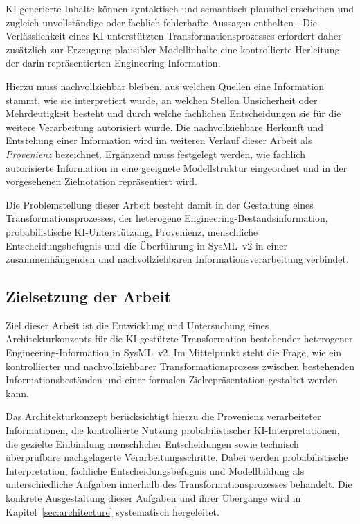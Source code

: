 KI-generierte Inhalte können syntaktisch und semantisch plausibel erscheinen
und zugleich unvollständige oder fachlich fehlerhafte Aussagen enthalten
\cite{Topcu2025,Barke2023,Sergeyuk2025}. Die Verlässlichkeit eines
KI-unterstützten Transformationsprozesses erfordert daher zusätzlich zur
Erzeugung plausibler Modellinhalte eine kontrollierte Herleitung der darin
repräsentierten Engineering-Information.

Hierzu muss nachvollziehbar bleiben, aus welchen Quellen eine Information
stammt, wie sie interpretiert wurde, an welchen Stellen Unsicherheit oder
Mehrdeutigkeit besteht und durch welche fachlichen Entscheidungen sie für
die weitere Verarbeitung autorisiert wurde. Die nachvollziehbare Herkunft
und Entstehung einer Information wird im weiteren Verlauf dieser Arbeit als
\emph{Provenienz} bezeichnet. Ergänzend muss festgelegt werden, wie fachlich
autorisierte Information in eine geeignete Modellstruktur eingeordnet und in
der vorgesehenen Zielnotation repräsentiert wird.

Die Problemstellung dieser Arbeit besteht damit in der Gestaltung eines
Transformationsprozesses, der heterogene Engineering-Bestandsinformation,
probabilistische KI-Unterstützung, Provenienz, menschliche
Entscheidungsbefugnis und die Überführung in SysML~v2 in einer
zusammenhängenden und nachvollziehbaren Informationsverarbeitung verbindet.


\subsection{Zielsetzung der Arbeit}
\label{sec:zielsetzung}

Ziel dieser Arbeit ist die Entwicklung und Untersuchung eines
Architekturkonzepts für die KI-gestützte Transformation bestehender
heterogener Engineering-Information in SysML~v2. Im Mittelpunkt steht die
Frage, wie ein kontrollierter und nachvollziehbarer Transformationsprozess
zwischen bestehenden Informationsbeständen und einer formalen
Zielrepräsentation gestaltet werden kann.

Das Architekturkonzept berücksichtigt hierzu die Provenienz verarbeiteter
Informationen, die kontrollierte Nutzung probabilistischer
KI-Interpretationen, die gezielte Einbindung menschlicher Entscheidungen
sowie technisch überprüfbare nachgelagerte Verarbeitungsschritte. Dabei
werden probabilistische Interpretation, fachliche Entscheidungsbefugnis und
Modellbildung als unterschiedliche Aufgaben innerhalb des
Transformationsprozesses behandelt. Die konkrete Ausgestaltung dieser
Aufgaben und ihrer Übergänge wird in Kapitel~\ref{sec:architecture}
systematisch hergeleitet.

